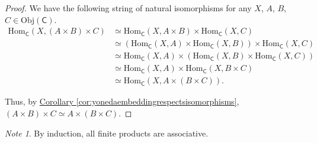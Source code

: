 \documentclass[a4paper]{report}
\newcommand{\Obj}{\mathrm{Obj}}
\newcommand{\Hom}{\mathrm{Hom}}
\theoremstyle{definition}
\theoremstyle{plain}
\theoremstyle{remark}
\newtheorem{note}{Note}[section]
\begin{document}
\begin{proof}
  We have the following string of natural isomorphisms for any $X$, $A$, $B$, $C \in \Obj(\mathsf{C})$.
  \begin{align*}
    \Hom_{\mathsf{C}}(X, (A \times B) \times C) &\simeq \Hom_{\mathsf{C}}(X, A \times B) \times \Hom_{\mathsf{C}}(X, C) \\
    & \simeq (\Hom_{\mathsf{C}}(X, A) \times \Hom_{\mathsf{C}}(X, B)) \times \Hom_{\mathsf{C}}(X, C) \\
    & \simeq \Hom_{\mathsf{C}}(X, A) \times (\Hom_{\mathsf{C}}(X, B) \times \Hom_{\mathsf{C}}(X, C)) \\
    & \simeq \Hom_{\mathsf{C}}(X, A) \times \Hom_{\mathsf{C}}(X, B \times C) \\
    & \simeq \Hom_{\mathsf{C}}(X, A \times (B \times C)).
  \end{align*}

  Thus, by \hyperref[cor:yonedaembeddingrespectsisomorphisms]{Corollary \ref*{cor:yonedaembeddingrespectsisomorphisms}}, $(A \times B) \times C \simeq A \times (B \times C)$.
\end{proof}

\begin{note}
  By induction, all finite products are associative.
\end{note}
\end{document}

